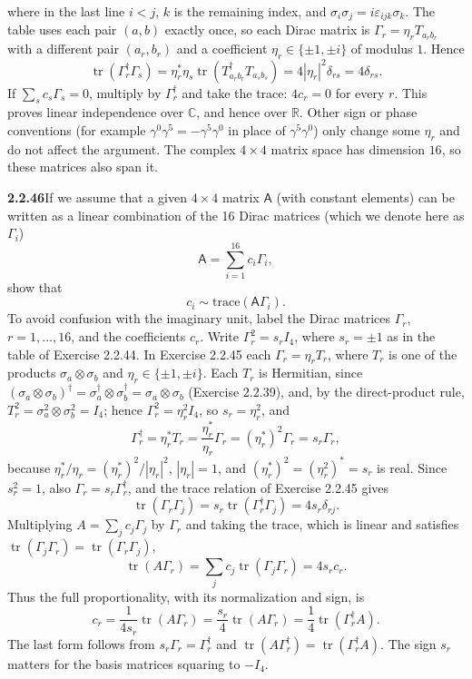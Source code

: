 where in the last line $i<j$, $k$ is the remaining index, and
$\sigma_i\sigma_j=i\varepsilon_{ijk}\sigma_k$.
The table uses each pair $(a,b)$ exactly once, so each Dirac matrix
is $\Gamma_r=\eta_rT_{a_rb_r}$ with a different pair $(a_r,b_r)$ and
a coefficient $\eta_r\in\{\pm1,\pm i\}$ of modulus $1$. Hence
\[
\operatorname{tr}(\Gamma_r^\dagger\Gamma_s)
=\eta_r^*\eta_s\operatorname{tr}(T_{a_rb_r}^\dagger T_{a_sb_s})
=4|\eta_r|^2\delta_{rs}=4\delta_{rs}.
\]
If $\sum_sc_s\Gamma_s=0$, multiply by $\Gamma_r^\dagger$ and
take the trace: $4c_r=0$ for every $r$. This proves linear
independence over $\mathbb C$, and hence over $\mathbb R$.
Other sign or phase conventions (for example $\gamma^0\gamma^5
=-\gamma^5\gamma^0$ in place of $\gamma^5\gamma^0$) only change some
$\eta_r$ and do not affect the argument.
The complex $4\times4$ matrix space has dimension $16$, so these
matrices also span it.

\par\bigskip
\noindent\textbf{2.2.46}\quad If we assume that a given $4\times4$ matrix
$\mathsf{A}$ (with constant elements) can be written as a linear combination
of the 16 Dirac matrices (which we denote here as $\Gamma_{i}$)
\[
\mathsf{A}=\sum_{i=1}^{16}c_{i}\Gamma_{i},
\]
show that
\[
c_{i}\sim\mathrm{trace}(\mathsf{A}\Gamma_{i}).
\]
\solution
To avoid confusion with the imaginary unit, label the Dirac matrices
$\Gamma_r$, $r=1,\ldots,16$, and the coefficients $c_r$.
Write $\Gamma_r^2=s_rI_4$, where $s_r=\pm1$ as in the table of
Exercise 2.2.44. In Exercise 2.2.45 each $\Gamma_r=\eta_rT_r$, where
$T_r$ is one of the products $\sigma_a\otimes\sigma_b$ and
$\eta_r\in\{\pm1,\pm i\}$. Each $T_r$ is Hermitian, since
$(\sigma_a\otimes\sigma_b)^\dagger=\sigma_a^\dagger\otimes\sigma_b^\dagger
=\sigma_a\otimes\sigma_b$ (Exercise 2.2.39), and, by the
direct-product rule, $T_r^2=\sigma_a^2\otimes\sigma_b^2=I_4$;
hence $\Gamma_r^2=\eta_r^2I_4$, so $s_r=\eta_r^2$, and
\[
\Gamma_r^\dagger=\eta_r^*T_r=\frac{\eta_r^*}{\eta_r}\Gamma_r
=(\eta_r^*)^2\Gamma_r=s_r\Gamma_r,
\]
because $\eta_r^*/\eta_r=(\eta_r^*)^2/|\eta_r|^2$, $|\eta_r|=1$, and
$(\eta_r^*)^2=(\eta_r^2)^*=s_r$ is real. Since $s_r^2=1$, also
$\Gamma_r=s_r\Gamma_r^\dagger$, and the trace relation of
Exercise 2.2.45 gives
\[
\operatorname{tr}(\Gamma_r\Gamma_j)
=s_r\operatorname{tr}(\Gamma_r^\dagger\Gamma_j)=4s_r\delta_{rj}.
\]
Multiplying $A=\sum_jc_j\Gamma_j$ by $\Gamma_r$ and taking the trace,
which is linear and satisfies
$\operatorname{tr}(\Gamma_j\Gamma_r)=\operatorname{tr}(\Gamma_r\Gamma_j)$,
\[
\operatorname{tr}(A\Gamma_r)=
\sum_jc_j\operatorname{tr}(\Gamma_j\Gamma_r)=4s_rc_r.
\]
Thus the full proportionality, with its normalization and sign, is
\[
\boxed{c_r=\frac1{4s_r}\operatorname{tr}(A\Gamma_r)
=\frac{s_r}{4}\operatorname{tr}(A\Gamma_r)
=\frac14\operatorname{tr}(\Gamma_r^\dagger A)}.
\]
The last form follows from $s_r\Gamma_r=\Gamma_r^\dagger$ and
$\operatorname{tr}(A\Gamma_r^\dagger)=\operatorname{tr}(\Gamma_r^\dagger A)$.
The sign $s_r$ matters for the basis matrices squaring to $-I_4$.

